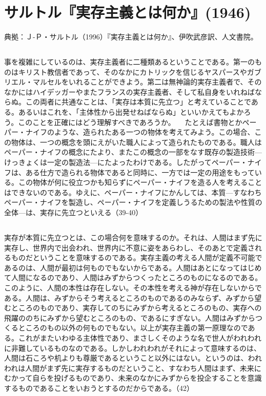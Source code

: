 \section{サルトル『実存主義とは何か』(1946)}


典拠：Ｊ-Ｐ・サルトル（1996）『実存主義とは何か』、伊吹武彦訳、人文書院。

\subsection{}


事を複雑にしているのは、実存主義者に二種類あるということである。第一のものはキリスト教信者であって、そのなかにカトリックを信じるヤスパースやガブリエル・マルセルをいれることができよう。第二は無神論的実存主義者で、そのなかにはハイデッガーやまたフランスの実存主義者、そして私自身をいれねばならぬ。この両者に共通なことは、「実存は本質に先立つ」と考えていることである。あるいはこれを、「主体性から出発せねばならぬ」といいかえてもよかろう。このことを正確にはどう理解すべきであろうか。
　たとえば書物とかペーパー・ナイフのような、造られたある一つの物体を考えてみよう。この場合、この物体は、一つの概念を頭にえがいた職人によって造られたものである。職人はペーパー・ナイフの概念にたより、またこの概念の一部をなす既存の製造技術{\——}けっきょくは一定の製造法{\——}にたよったわけである。したがってペーパー・ナイフは、ある仕方で造られる物体であると同時に、一方では一定の用途をもっている。この物体が何に役立つかも知らずにペーパー・ナイフを造る人を考えることはできないのである。ゆえに、ペーパー・ナイフにかんしては、本質{\——}すなわちペーパー・ナイフを製造し、ペーパー・ナイフを定義しうるための製法や性質の全体{\——}は、実存に先立つといえる（39-40）


\subsection{}

実存が本質に先立つとは、この場合何を意味するのか。それは、人間はまず先に実存し、世界内で出会われ、世界内に不意に姿をあらわし、そのあとで定義されるものだということを意味するのである。実存主義の考える人間が定義不可能であるのは、人間が最初は何ものでもないからである。人間はあとになってはじめて人間になるのであり、人間はみずからつくったところのものになるのである。このように、人間の本性は存在しない。その本性を考える神が存在しないからである。人間は、みずからそう考えるところのものであるのみならず、みずから望むところのものであり、実存してのちにみずから考えるところのもの、実存への飛躍ののちにみずから望むところのもの、であるにすぎない。人間はみずからつくるところのもの以外の何ものでもない。以上が実存主義の第一原理なのである。これがまたいわゆる主体性であり、まさしくそのような名で世人がわれわれに非難しているものなのである。しかしわれわれがそれによって意味するのは、人間は石ころや机よりも尊厳であるということ以外にはない。というのは、われわれは人間がまず先に実存するものだということ、すなわち人間はまず、未来にむかって自らを投げるものであり、未来のなかにみずからを投企することを意識するものであることをいおうとするのだからである。（42）

